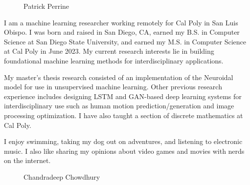 \documentclass{article}
\begin{document}
\begin{figure}
    \centering
    \vspace{-6mm}\Large{Patrick Perrine}\vspace{5mm}
    {%
	   \setlength{\fboxsep}{0pt}%
	   \setlength{\fboxrule}{3pt}%
	 }%
\end{figure} \hfill

I am a machine learning researcher working remotely for Cal Poly in San Luis Obispo. I was born and raised in San Diego, CA, earned my B.S. in Computer Science at San Diego State University, and earned my M.S. in Computer Science at Cal Poly in June 2023. My current research interests lie in building foundational machine learning methods for interdisciplinary applications. 

My master’s thesis research consisted of an implementation of the Neuroidal model for use in unsupervised machine learning. Other previous research experience includes designing LSTM and GAN-based deep learning systems for interdisciplinary use such as human motion prediction/generation and image processing optimization. I have also taught a section of discrete mathematics at Cal Poly.

I enjoy swimming, taking my dog out on adventures, and listening to electronic music. I also like sharing my opinions about video games and movies with nerds on the internet.

\let\thefootnote\relax{}

\newpage

\begin{figure}
    \centering
    \Large{Chandradeep Chowdhury}\vspace{5mm}
    {%
	   \setlength{\fboxsep}{0pt}%
	   \setlength{\fboxrule}{3pt}%
	 }%
\end{figure} \hfill
\end{document}
